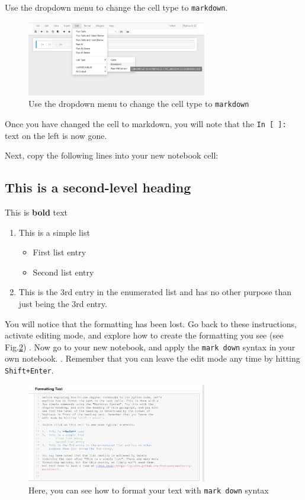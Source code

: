 \documentclass[svgnames, 11pt, lettersize]{article}
\begin{document}
Use the dropdown menu to change the cell type to \texttt{markdown}.
\begin{figure}[htbp]
\centering
\includegraphics[width=0.7\textwidth]{./figures/Screenshot_20200527_150324.png}
\caption{\label{celltype}Use the dropdown menu to change the cell type to \texttt{markdown}}
\end{figure}


Once you have changed the cell to markdown, you will note that the \texttt{In
[ ]:} text on the left is now gone.

Next, copy the following lines into your new notebook cell:
\subsection{This is a second-level heading}
\label{sec:orge6fcbb4}

This is \textbf{bold} text

\begin{enumerate}
\item This is a simple list
\begin{itemize}
\item First list entry
\item Second list entry
\end{itemize}
\item This is the 3rd entry in the enumerated list and has no other
purpose than just being the 3rd entry.
\end{enumerate}

You will notice that the formatting has been lost. Go back to these
instructions, activate editing mode, and explore how to create the
formatting you see (see Fig.\ref{mdsyntax}) . Now go to your new
notebook, and apply the \texttt{mark down} syntax in your own notebook.
. Remember that you can leave the
edit mode any time by hitting \texttt{Shift+Enter}.

\begin{figure}[htbp]
\centering
\includegraphics[width=0.7\textwidth]{./figures/Screenshot_20200527_153811.png}
\caption{\label{mdsyntax}Here, you can see how to format your text with \texttt{mark down} syntax}
\end{figure}
\end{document}
